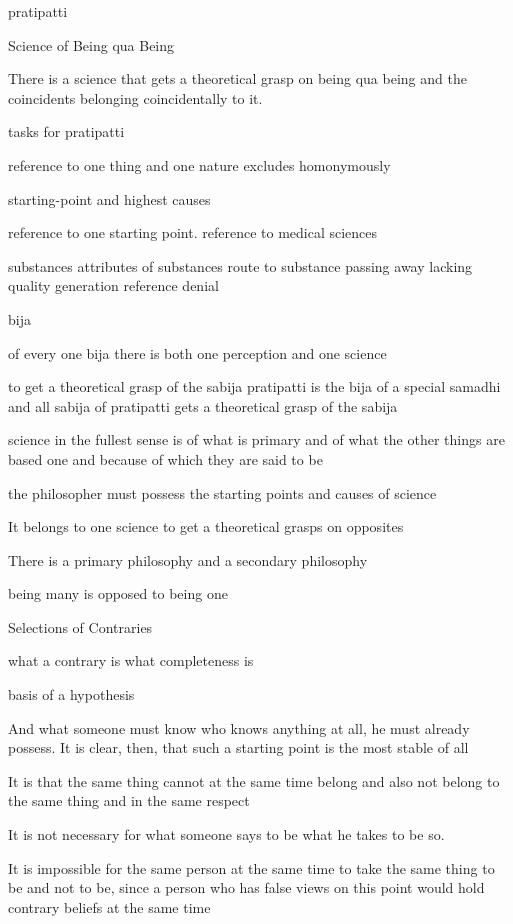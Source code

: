pratipatti

Science of Being qua Being

There is a science that gets a theoretical grasp  on being qua being
and the coincidents belonging coincidentally to it.

tasks for pratipatti

reference to one thing and one nature
    excludes homonymously

starting-point and highest causes

reference to one starting point.
    reference to medical sciences

substances
attributes of substances
route to substance
passing away
lacking
quality
generation
reference
denial

bija

of every one bija there is both one perception and one science

to get a theoretical grasp of the sabija
pratipatti is the bija of a special samadhi
and all sabija of pratipatti gets a theoretical grasp of the sabija

science in the fullest sense is of what is primary
and of what the other things are based one
and because of which they are said to be

the philosopher must possess the starting points and causes of science

It belongs to one science to get a theoretical grasps on opposites

There is a primary philosophy and a secondary philosophy

being many is opposed to being one

Selections of Contraries


what a contrary is
what completeness is

basis of a hypothesis

And what someone must know who knows anything at all,
he must already possess.
It is clear, then, that such a starting point is the most stable of all

It is that the same thing cannot at the same time belong and also not belong
to the same thing and in the same respect

It is not necessary for what someone says to be
what he takes to be so.

It is impossible for the same person at the same time
to take the same thing to be and not to be,
since a person who has false views on this point
would hold contrary beliefs at the same time